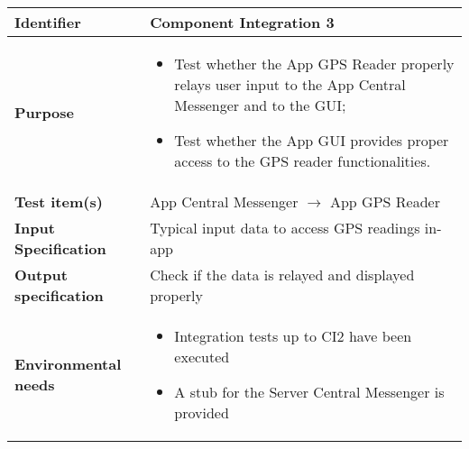 
\begin{center}
\begin{tabular}{lp{}}
\toprule
\textbf{Identifier}		&	Component Integration 3\\
\midrule
\textbf{Purpose}		&	\begin{itemize}
					\item Test whether the App GPS Reader properly relays user input to the App Central Messenger and to the GUI;
					\item Test whether the App GUI provides proper access to the GPS reader functionalities.
					\end{itemize}	\\
\textbf{Test item(s)}	&	App Central Messenger $\rightarrow$ App GPS Reader\\
			
\textbf{Input Specification}	&	Typical input data to access GPS readings in-app\\
\textbf{Output specification}	&	Check if the data is relayed and displayed properly\\
\textbf{Environmental needs}	&	\begin{itemize}
							\item Integration tests up to CI2 have been executed
							\item A stub for the Server Central Messenger is provided
							\end{itemize}	\\
\bottomrule
\end{tabular}
\end{center}


